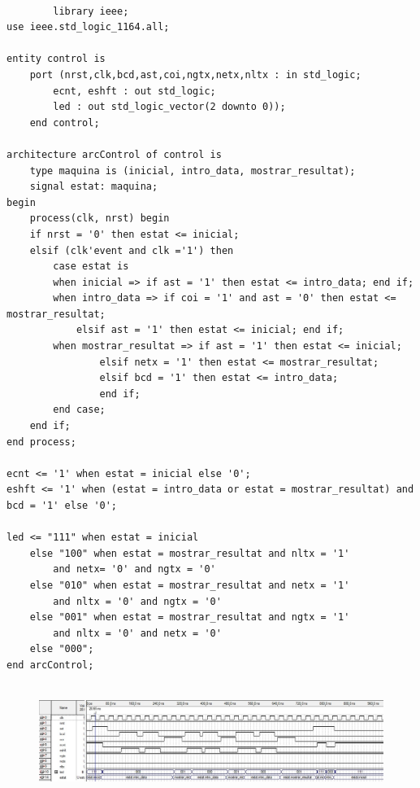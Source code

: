 \documentclass[12pt, a4papre]{article}
\begin{document}
		\begin{lstlisting}[style=vhdl, frame=single, basicstyle=\tiny]
		
		library ieee;
use ieee.std_logic_1164.all;

entity control is
	port (nrst,clk,bcd,ast,coi,ngtx,netx,nltx : in std_logic;
		ecnt, eshft : out std_logic;
		led : out std_logic_vector(2 downto 0));
	end control;

architecture arcControl of control is 
	type maquina is (inicial, intro_data, mostrar_resultat);
	signal estat: maquina;
begin
	process(clk, nrst) begin
	if nrst = '0' then estat <= inicial;
	elsif (clk'event and clk ='1') then
	    case estat is 
	    when inicial => if ast = '1' then estat <= intro_data; end if;
	    when intro_data => if coi = '1' and ast = '0' then estat <= mostrar_resultat;
			elsif ast = '1' then estat <= inicial; end if;
	    when mostrar_resultat => if ast = '1' then estat <= inicial;
				elsif netx = '1' then estat <= mostrar_resultat;
				elsif bcd = '1' then estat <= intro_data;
				end if;
	    end case;
	end if;
end process;

ecnt <= '1' when estat = inicial else '0';
eshft <= '1' when (estat = intro_data or estat = mostrar_resultat) and bcd = '1' else '0';
			
led <= "111" when estat = inicial 
    else "100" when estat = mostrar_resultat and nltx = '1' 
        and netx= '0' and ngtx = '0'
    else "010" when estat = mostrar_resultat and netx = '1' 
    	and nltx = '0' and ngtx = '0'
    else "001" when estat = mostrar_resultat and ngtx = '1' 
    	and nltx = '0' and netx = '0'
    else "000";
end arcControl;
		
		\end{lstlisting}
		
		

		\begin{figure}[H]
		\begin{center}
		\includegraphics[width=130mm]{simulacioControl.jpeg}
		\end{center}
	\end{figure}	
	
\end{document}
